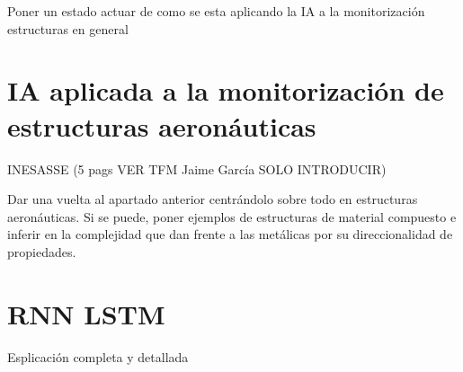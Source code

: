 Poner un estado actuar de como se esta aplicando la IA a la monitorización estructuras en general

\clearpage



\section{IA aplicada a la monitorización de estructuras aeronáuticas}

INESASSE (5 pags VER TFM Jaime García SOLO INTRODUCIR)

Dar una vuelta al apartado anterior centrándolo sobre todo en estructuras aeronáuticas. Si se puede, poner ejemplos de estructuras de material compuesto e inferir en la complejidad que dan frente a las metálicas por su direccionalidad de propiedades.



\section{RNN LSTM}

Esplicación completa y detallada

\clearpage

